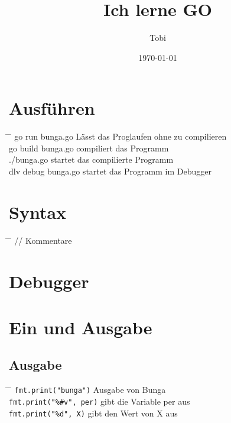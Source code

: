 \documentclass[a4paper,12pt,twoside]{article}
\title{Ich lerne GO}
\author{Tobi}
\date{\today}
\begin{document}
\maketitle
\thispagestyle{empty} %
\newpage

\tableofcontents
\newpage

\section{Ausführen}
\begin{tabbing}
  \hspace{2mm} \= \hspace{50mm} \= \kill
\>  go run bunga.go \> Lässt das Proglaufen ohne zu compilieren \\
\>  go build bunga.go \> compiliert das Programm \\ 
\>  ./bunga.go \> startet das compilierte Programm \\ 
\>  dlv debug bunga.go \> startet das Programm im Debugger \\
\end{tabbing}

\section{Syntax}
\begin{tabbing}
 \hspace{2mm} \= \hspace{50mm} \= \kill
  \> // \> Kommentare \\
\end{tabbing}
\section{Debugger}
\section{Ein und Ausgabe}
\subsection{Ausgabe}
\begin{tabbing}
 \hspace{2mm} \= \hspace{50mm} \= \kill
 \> \verb|fmt.print("bunga")| \> Ausgabe von Bunga \\
 \> \verb|fmt.print("%#v", per)| \> gibt die Variable per aus \\
 \> \verb|fmt.print("%d", X)| \> gibt den Wert von X aus \\
\end{tabbing}
\end{document}
